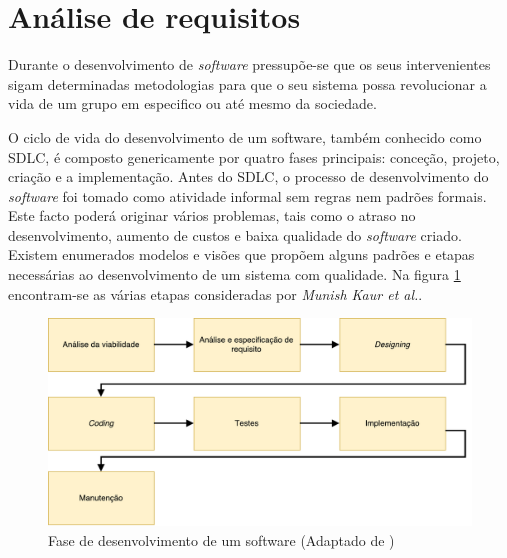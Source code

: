 \newpage







\section{Análise de requisitos}
\label{sect:analise}

Durante o desenvolvimento de \textit{software} pressupõe-se que os seus intervenientes sigam determinadas metodologias para que o seu sistema possa revolucionar a vida de um grupo em especifico ou até mesmo da sociedade. 


O ciclo de vida do desenvolvimento de um software, também conhecido como \ac{SDLC}, é composto genericamente por quatro fases principais: conceção, projeto, criação e a implementação. Antes do \ac{SDLC}, o processo de desenvolvimento do \textit{software} foi tomado como atividade informal sem regras nem padrões formais. Este facto poderá originar vários problemas, tais como o atraso no desenvolvimento, aumento de custos e baixa qualidade do \textit{software} criado. Existem enumerados modelos e visões que propõem alguns padrões e etapas necessárias ao desenvolvimento de um sistema com qualidade.
Na figura \ref{sdlcartic} encontram-se as várias etapas consideradas por \textit{Munish Kaur et al.}\cite{Saini2014}.





\begin{figure}[!htb]
	\centering
	\includegraphics[scale=0.6]{esquemas/desenvolvimentoSW.pdf}
	\caption[Fase de desenvolvimento de um software ]{Fase de desenvolvimento de um software (Adaptado de \cite{Saini2014})}
	\label{sdlcartic}
\end{figure}




